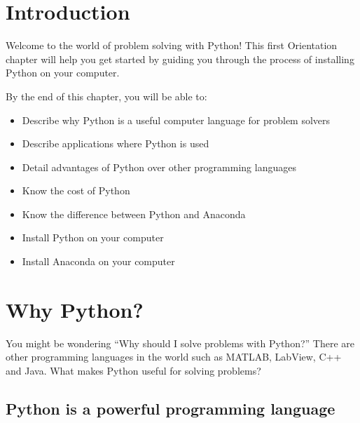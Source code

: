 \documentclass{book}
\begin{document}
    
        \section{Introduction}\label{introduction}
    




    
        Welcome to the world of problem solving with Python! This first
Orientation chapter will help you get started by guiding you through the
process of installing Python on your computer.
    




    
        By the end of this chapter, you will be able to:

\begin{itemize}
\item
  Describe why Python is a useful computer language for problem solvers
\item
  Describe applications where Python is used
\item
  Detail advantages of Python over other programming languages
\item
  Know the cost of Python
\item
  Know the difference between Python and Anaconda
\item
  Install Python on your computer
\item
  Install Anaconda on your computer
\end{itemize}
        \newpage



    




    
        \section{Why Python?}\label{why-python}
    




    
        You might be wondering ``Why should I solve problems with Python?''
There are other programming languages in the world such as MATLAB,
LabView, C++ and Java. What makes Python useful for solving problems?
    




    
        \subsection{Python is a powerful programming
language}\label{python-is-a-powerful-programming-language}
\end{document}
